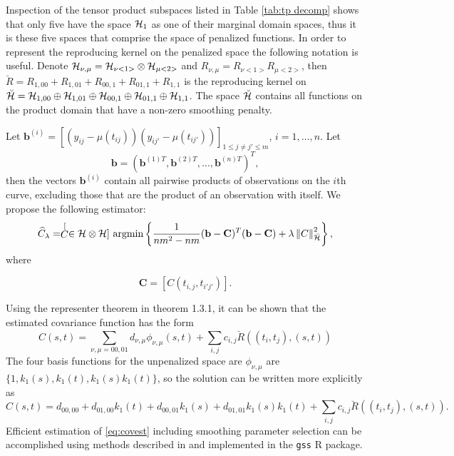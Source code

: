 Inspection of the tensor product subspaces listed in Table \ref{tab:tp decomp} shows that only five have the space $\mathcal{H}_1$ as one of their marginal domain spaces, thus it is these five spaces that comprise the space of penalized functions. In order to represent the reproducing kernel on the penalized space the following notation is useful. Denote $\mathcal{H}_{\nu, \mu}=\mathcal{H}_{\nu <1>}\otimes \mathcal{H}_{\mu <2>}$ and $R_{\nu, \mu}=R_{\nu <1>}R_{\mu <2>}$, then $\breve{R} = R_{1,00}+R_{1,01}+R_{00,1}+R_{01,1}+R_{1,1}$ is the reproducing kernel on $\breve{\mathcal{H}} = \mathcal{H}_{1,00}\oplus\mathcal{H}_{1,01}\oplus\mathcal{H}_{00,1}\oplus\mathcal{H}_{01,1}\oplus\mathcal{H}_{1,1}$. The space $\breve{\mathcal{H}}$ contains all functions on the product domain that have a non-zero smoothing penalty.

Let $\mathbf{b}^{(i)} = [(y_{ij}-\mu(t_{ij}))(y_{ij'}-\mu(t_{ij'}))]_{1\leq j\neq j'\leq m}$, $i=1, \dots, n$. Let
\[ \mathbf{b} = (\mathbf{b}^{(1)T}, \mathbf{b}^{(2)T}, \dots, \mathbf{b}^{(n)T} )^T, \]
then the vectors $\mathbf{b}^{(i)}$ contain all pairwise products of observations on the $i$th curve, excluding those that are the product of an observation with itself. We propose the following estimator:
\[ \widehat{C}_{\lambda}=\stackrel[C \in \mathcal{H}\otimes \mathcal{H}]{}{\text{ argmin}} \left\{\frac{1}{nm^2-nm} (\mathbf{b} - \mathbf{C})^T(\mathbf{b} - \mathbf{C})+\lambda\left\Vert C\right\Vert _{\breve{\mathcal{H}}}^{2} \right\}, \]
where

\[ \mathbf{C} = [C(t_{i,j}, t_{i'j'})]. \]

Using the representer theorem in \cite{Wahba:1990} theorem 1.3.1, it can be shown that the estimated covariance function has the form 
\begin{equation}
	\hat{C}(s,t) = \sum_{\nu, \mu=00,01}d_{\nu,\mu}\phi_{\nu,\mu}(s,t) + \sum_{i,j}c_{i,j}\breve{R}((t_i,t_j),(s,t))	
\end{equation}
The four basis functions for the unpenalized space are $\phi_{\nu,\mu}$ are $\{ 1, k_1(s), k_1(t), k_1(s)k_1(t) \}$, so the solution can be written more explicitly as 
\begin{equation}
	\hat{C}(s,t) = d_{00,00} + d_{01,00}k_1(t) + d_{00,01}k_1(s) + d_{01,01}k_1(s)k_1(t) + \sum_{i,j}c_{i,j}\breve{R}((t_i,t_j),(s,t)). \label{eq:covest} 
\end{equation}
Efficient estimation of \eqref{eq:covest} including smoothing parameter selection can be accomplished using methods described in \cite{Gu2002} and implemented in the \texttt{gss} R package. 

